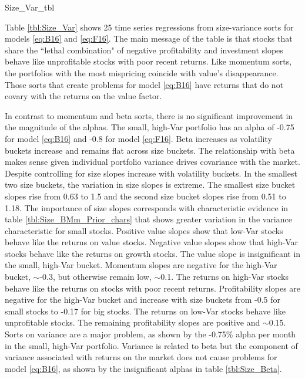 
{Size_Var_tbl}

Table \ref{tbl:Size_Var} shows 25 time series regressions from
size-variance sorts for models \ref{eq:B16} and \ref{eq:F16}.
The main message of the table is that stocks that share the
``lethal combination" of negative profitability and investment slopes behave
like unprofitable stocks with poor recent returns.
Like momentum sorts, the portfolios with the most mispricing coincide with
value's disappearance.
Those sorts that create problems for model \ref{eq:B16} have returns that do
not covary with the returns on the value factor.

In contrast to momentum and beta sorts, there is no significant improvement in
the magnitude of the alphas.
The small, high-Var portfolio has an alpha of -0.75 for model \ref{eq:B16} and
-0.8 for model \ref{eq:F16}.
Beta increases as volatility buckets increase and remains flat across size
buckets.
The relationship with beta makes sense given individual portfolio
variance drives covariance with the market.
Despite controlling for size slopes increase with volatility buckets.
In the smallest two size buckets, the variation in size slopes is extreme.
The smallest size bucket slopes rise from 0.63 to 1.5
and the second size bucket slopes rise from 0.51 to 1.18.
The importance of size slopes corresponds with characteristic evidence in
table \ref{tbl:Size_BMm_Prior_chars} that shows greater variation in the
variance characteristic for small stocks.
Positive value slopes show that low-Var stocks behave like the returns on value stocks.
Negative value slopes show that high-Var stocks behave like the returns on growth stocks.
The value slope is insignificant in the small, high-Var bucket.
Momentum slopes are negative for the high-Var bucket, $\sim$-0.3, but
otherwise remain low, $\sim$0.1.
The returns on high-Var stocks behave like the returns on stocks with poor
recent returns. 
Profitability slopes are negative for the high-Var bucket and increase with
size buckets from -0.5 for small stocks to -0.17 for big stocks.
The returns on low-Var stocks behave like unprofitable stocks.
The remaining profitability slopes are positive and $\sim$0.15.
Sorts on variance are a major problem, as shown by the -0.75\% alpha per month
in the small, high-Var portfolio.
Variance is related to beta but the component of variance associated with
returns on the market does not cause problems for model \ref{eq:B16}, as shown
by the insignificant alphas in table \ref{tbl:Size_Beta}.

